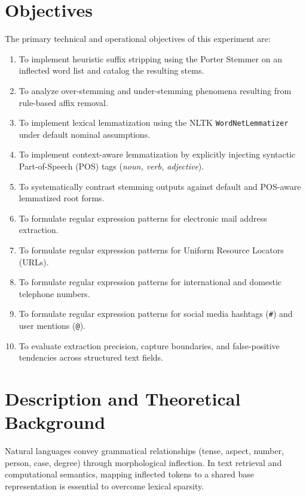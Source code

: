 \section{Objectives}
The primary technical and operational objectives of this experiment are:
\begin{enumerate}[label=\textbf{\arabic*.}]
    \item To implement heuristic suffix stripping using the Porter Stemmer on an inflected word list and catalog the resulting stems.
    \item To analyze over-stemming and under-stemming phenomena resulting from rule-based affix removal.
    \item To implement lexical lemmatization using the NLTK \texttt{WordNetLemmatizer} under default nominal assumptions.
    \item To implement context-aware lemmatization by explicitly injecting syntactic Part-of-Speech (POS) tags (\textit{noun, verb, adjective}).
    \item To systematically contrast stemming outputs against default and POS-aware lemmatized root forms.
    \item To formulate regular expression patterns for electronic mail address extraction.
    \item To formulate regular expression patterns for Uniform Resource Locators (URLs).
    \item To formulate regular expression patterns for international and domestic telephone numbers.
    \item To formulate regular expression patterns for social media hashtags (\texttt{\#}) and user mentions (\texttt{@}).
    \item To evaluate extraction precision, capture boundaries, and false-positive tendencies across structured text fields.
\end{enumerate}

\section{Description and Theoretical Background}
Natural languages convey grammatical relationships (tense, aspect, number, person, case, degree) through morphological inflection. In text retrieval and computational semantics, mapping inflected tokens to a shared base representation is essential to overcome lexical sparsity.

